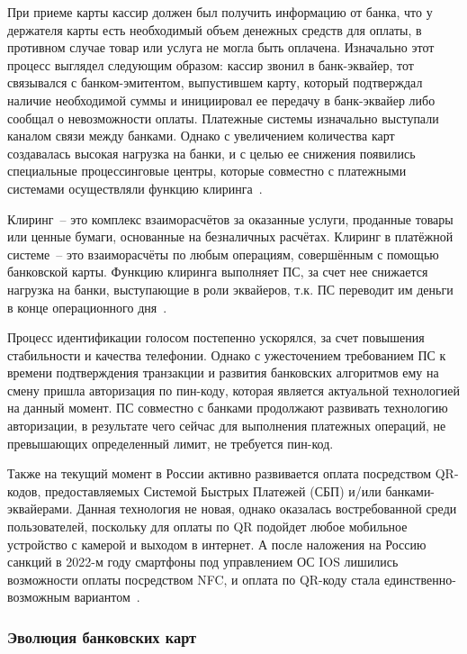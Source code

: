 При приеме карты кассир должен был получить информацию от банка, что у держателя карты есть необходимый объем денежных средств для оплаты, в противном случае товар или услуга не могла быть оплачена.
Изначально этот процесс выглядел следующим образом: кассир звонил в банк-эквайер, тот связывался с банком-эмитентом, выпустившем карту, который подтверждал наличие необходимой суммы и инициировал ее передачу в банк-эквайер либо сообщал о невозможности оплаты.
Платежные системы изначально выступали каналом связи между банками.
Однако с увеличением количества карт создавалась высокая нагрузка на банки, и с целью ее снижения появились специальные процессинговые центры, которые совместно с платежными системами осуществляли функцию клиринга~\cite{habr_fondy_payment_history}.

Клиринг~-- это комплекс взаиморасчётов за оказанные услуги, проданные товары или ценные бумаги, основанные на безналичных расчётах.
Клиринг в платёжной системе~-- это взаиморасчёты по любым операциям, совершённым с помощью банковской карты.
Функцию клиринга выполняет ПС, за счет нее снижается нагрузка на банки, выступающие в роли эквайеров, т.к. ПС переводит им деньги в конце операционного дня~\cite{habr_nspk_cliring}.

Процесс идентификации голосом постепенно ускорялся, за счет повышения стабильности и качества телефонии.
Однако с ужесточением требованием ПС к времени подтверждения транзакции и развития банковских алгоритмов ему на смену пришла авторизация по пин-коду, которая является актуальной технологией на данный момент.
ПС совместно с банками продолжают развивать технологию авторизации, в результате чего сейчас для выполнения платежных операций, не превышающих определенный лимит, не требуется пин-код.

Также на текущий момент в России активно развивается оплата посредством QR-кодов, предоставляемых Системой Быстрых Платежей (СБП) и/или банками-эквайерами.
Данная технология не новая, однако оказалась востребованной среди пользователей, поскольку для оплаты по QR подойдет любое мобильное устройство с камерой и выходом в интернет. 
А после наложения на Россию санкций в 2022-м году смартфоны под управлением ОС IOS лишились возможности оплаты посредством NFC, и оплата по QR-коду стала единственно-возможным вариантом~\cite{habr_nspk_qr}.


\subsubsection{Эволюция банковских карт}

